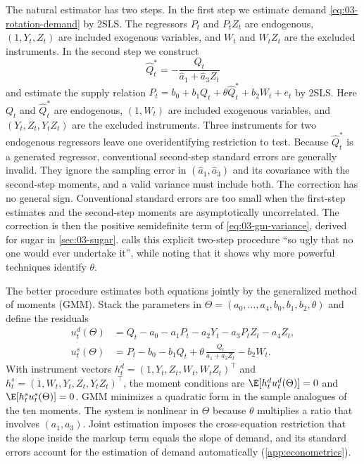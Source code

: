 The natural estimator has two steps. In the first step we estimate demand \eqref{eq:03-rotation-demand} by 2SLS. The
regressors $P_t$ and $P_tZ_t$ are endogenous, $(1, Y_t, Z_t)$ are included exogenous variables, and $W_t$ and $W_tZ_t$
are the excluded instruments. In the second step we construct
\begin{equation*}
\hat Q^*_t = -\frac{Q_t}{\hat a_1 + \hat a_3 Z_t}
\end{equation*}
and estimate the supply relation $P_t = b_0 + b_1 Q_t + \theta \hat Q^*_t + b_2 W_t + e_t$ by 2SLS. Here $Q_t$ and
$\hat Q^*_t$ are endogenous, $(1, W_t)$ are included exogenous variables, and $(Y_t, Z_t, Y_tZ_t)$ are the excluded
instruments. Three instruments for two endogenous regressors leave one overidentifying restriction to test. Because
$\hat Q^*_t$ is a generated regressor, conventional second-step standard errors are generally invalid. They ignore the
sampling error in $(\hat a_1, \hat a_3)$ and its covariance with the second-step moments, and a valid variance must
include both. The correction has no general sign. Conventional standard errors are too small when the first-step
estimates and the second-step moments are asymptotically uncorrelated. The correction is then the positive semidefinite
term of \eqref{eq:03-gm-variance}, derived for sugar in \cref{sec:03-sugar}.
\citet[p.~1033, fn.~23]{Bresnahan1989} calls this explicit two-step procedure ``so ugly that no one would ever undertake
it'', while noting that it shows why more powerful techniques identify $\theta$.

The better procedure estimates both equations jointly by the generalized method of moments (GMM). Stack the parameters in
$\Theta = (a_0, \dots, a_4, b_0, b_1, b_2, \theta)$ and define the residuals
\begin{equation}\label{eq:03-rotation-gmm}
\begin{aligned}
u^d_t(\Theta) &= Q_t - a_0 - a_1 P_t - a_2 Y_t - a_3 P_t Z_t - a_4 Z_t ,\\
u^s_t(\Theta) &= P_t - b_0 - b_1 Q_t + \theta\, \frac{Q_t}{a_1 + a_3 Z_t} - b_2 W_t .
\end{aligned}
\end{equation}
With instrument vectors $h^d_t = (1, Y_t, Z_t, W_t, W_tZ_t)^\top$ and $h^s_t = (1, W_t, Y_t, Z_t, Y_tZ_t)^\top$, the
moment conditions are $\E[h^d_t u^d_t(\Theta)] = 0$ and $\E[h^s_t u^s_t(\Theta)] = 0$. GMM minimizes a quadratic form in the
sample analogues of the ten moments. The system is nonlinear in $\Theta$ because $\theta$ multiplies a ratio that involves
$(a_1, a_3)$. Joint estimation imposes the cross-equation restriction that the slope inside the markup term equals the
slope of demand, and its standard errors account for the estimation of demand automatically (\cref{app:econometrics}).


